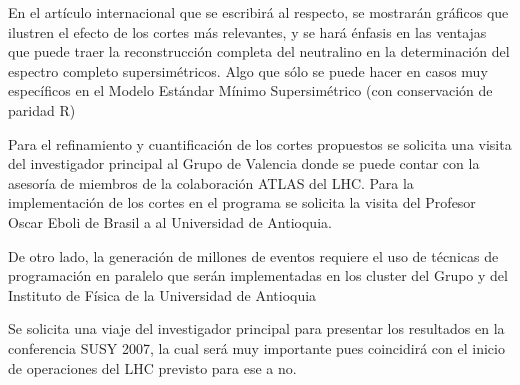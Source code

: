 En el artículo internacional que se escribirá al respecto, se
mostrarán gráficos que ilustren el efecto de los cortes más
relevantes, y se hará énfasis en las ventajas que puede traer la
reconstrucción completa del neutralino en la determinación del
espectro completo supersimétricos. Algo que sólo se puede hacer en
casos muy específicos en el Modelo Estándar Mínimo Supersimétrico
(con conservación de paridad R)

Para el refinamiento y cuantificación de los cortes propuestos se
solicita una visita del investigador principal al Grupo de Valencia
donde se puede contar con la asesoría de miembros de la colaboración
ATLAS del LHC.  Para la implementación de los cortes en el programa se
solicita la visita del Profesor Oscar Eboli de Brasil a al Universidad
de Antioquia.

De otro lado, la generación de millones de eventos requiere el uso de
técnicas de programación en paralelo que serán implementadas en los
cluster del Grupo y del Instituto de Física de la Universidad de
Antioquia

Se solicita una viaje del investigador principal para presentar los
resultados en la conferencia SUSY 2007, la cual será muy importante
pues coincidirá con el inicio de operaciones del LHC previsto para ese
a no.

